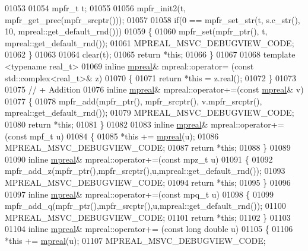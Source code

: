 \begin{DoxyCode}
01053 
01054     mpfr\_t t;
01055 
01056     mpfr\_init2(t, mpfr\_get\_prec(mpfr\_srcptr()));
01057 
01058     \textcolor{keywordflow}{if}(0 == mpfr\_set\_str(t, s.c\_str(), 10, mpreal::get\_default\_rnd()))
01059     \{
01060         mpfr\_set(mpfr\_ptr(), t, mpreal::get\_default\_rnd());
01061         MPREAL\_MSVC\_DEBUGVIEW\_CODE;
01062     \}
01063 
01064     clear(t);
01065     \textcolor{keywordflow}{return} *\textcolor{keyword}{this};
01066 \}
01067 
01068 \textcolor{keyword}{template} <\textcolor{keyword}{typename} real\_t>
01069 \textcolor{keyword}{inline} \hyperlink{classmpfr_1_1mpreal}{mpreal}& mpreal::operator= (\textcolor{keyword}{const} std::complex<real\_t>& z)
01070 \{
01071     \textcolor{keywordflow}{return} *\textcolor{keyword}{this} = z.real();
01072 \}
01073 
01075 \textcolor{comment}{// + Addition}
01076 \textcolor{keyword}{inline} \hyperlink{classmpfr_1_1mpreal}{mpreal}& mpreal::operator+=(\textcolor{keyword}{const} \hyperlink{classmpfr_1_1mpreal}{mpreal}& v)
01077 \{
01078     mpfr\_add(mpfr\_ptr(), mpfr\_srcptr(), v.mpfr\_srcptr(), mpreal::get\_default\_rnd());
01079     MPREAL\_MSVC\_DEBUGVIEW\_CODE;
01080     \textcolor{keywordflow}{return} *\textcolor{keyword}{this};
01081 \}
01082 
01083 \textcolor{keyword}{inline} \hyperlink{classmpfr_1_1mpreal}{mpreal}& mpreal::operator+=(\textcolor{keyword}{const} mpf\_t u)
01084 \{
01085     *\textcolor{keyword}{this} += \hyperlink{classmpfr_1_1mpreal}{mpreal}(u);
01086     MPREAL\_MSVC\_DEBUGVIEW\_CODE;
01087     \textcolor{keywordflow}{return} *\textcolor{keyword}{this};
01088 \}
01089 
01090 \textcolor{keyword}{inline} \hyperlink{classmpfr_1_1mpreal}{mpreal}& mpreal::operator+=(\textcolor{keyword}{const} mpz\_t u)
01091 \{
01092     mpfr\_add\_z(mpfr\_ptr(),mpfr\_srcptr(),u,mpreal::get\_default\_rnd());
01093     MPREAL\_MSVC\_DEBUGVIEW\_CODE;
01094     \textcolor{keywordflow}{return} *\textcolor{keyword}{this};
01095 \}
01096 
01097 \textcolor{keyword}{inline} \hyperlink{classmpfr_1_1mpreal}{mpreal}& mpreal::operator+=(\textcolor{keyword}{const} mpq\_t u)
01098 \{
01099     mpfr\_add\_q(mpfr\_ptr(),mpfr\_srcptr(),u,mpreal::get\_default\_rnd());
01100     MPREAL\_MSVC\_DEBUGVIEW\_CODE;
01101     \textcolor{keywordflow}{return} *\textcolor{keyword}{this};
01102 \}
01103 
01104 \textcolor{keyword}{inline} \hyperlink{classmpfr_1_1mpreal}{mpreal}& mpreal::operator+= (\textcolor{keyword}{const} \textcolor{keywordtype}{long} \textcolor{keywordtype}{double} u)
01105 \{
01106     *\textcolor{keyword}{this} += \hyperlink{classmpfr_1_1mpreal}{mpreal}(u);
01107     MPREAL\_MSVC\_DEBUGVIEW\_CODE;

\end{DoxyCode}

